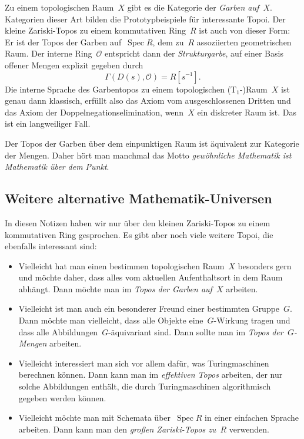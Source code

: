 \documentclass[a4paper,ngerman,12pt]{scrartcl}
\theoremstyle{definition}
\theoremstyle{plain}
\theoremstyle{remark}
\renewcommand{\O}{\mathcal{O}}
\DeclareMathOperator{\Spec}{Spec}
\renewcommand{\_}{\mathpunct{.}\,}
\newcommand{\?}{\,{:}\,}
\begin{document}
Zu einem topologischen Raum~$X$ gibt es die Kategorie der \emph{Garben
auf~$X$}. Kategorien dieser Art bilden die Prototypbeispiele für interessante
Topoi. Der kleine Zariski-Topos zu einem kommutativen Ring~$R$ ist auch von
dieser Form: Er ist der Topos der Garben auf~$\Spec R$, dem zu~$R$ assoziierten
geometrischen Raum. Der interne Ring~$\O$ entspricht dann der
\emph{Strukturgarbe}, auf einer Basis offener Mengen explizit gegeben durch
\[ \Gamma(D(s), \O) = R[s^{-1}]. \]
Die interne Sprache des Garbentopos zu einem topologischen ($\text{T}_1$-)Raum~$X$ ist genau
dann klassisch, erfüllt also das Axiom vom ausgeschlossenen Dritten und das
Axiom der Doppelnegationselimination, wenn~$X$ ein diskreter Raum ist. Das ist
ein langweiliger Fall.

Der Topos der Garben über dem einpunktigen Raum ist äquivalent zur Kategorie
der Mengen. Daher hört man manchmal das Motto \emph{gewöhnliche Mathematik ist
Mathematik über dem Punkt}.


\subsection*{Weitere alternative Mathematik-Universen}

In diesen Notizen haben wir nur über den kleinen Zariski-Topos zu einem
kommutativen Ring gesprochen. Es gibt aber noch viele weitere Topoi, die
ebenfalls interessant sind:
\begin{itemize}
\item Vielleicht hat man einen bestimmen topologischen Raum~$X$ besonders gern
und möchte daher, dass alles vom aktuellen Aufenthaltsort
in dem Raum abhängt. Dann möchte man im \emph{Topos der Garben auf~$X$}
arbeiten.
\item Vielleicht ist man auch ein besonderer Freund einer bestimmten
Gruppe~$G$. Dann möchte man vielleicht, dass alle Objekte
eine~$G$-Wirkung tragen und dass alle Abbildungen~$G$-äquivariant
sind. Dann sollte man im \emph{Topos der~$G$-Mengen} arbeiten.
\item Vielleicht interessiert man sich vor allem dafür, was Turingmaschinen
berechnen können. Dann kann man im \emph{effektiven Topos} arbeiten, der nur
solche Abbildungen enthält, die durch Turingmaschinen algorithmisch gegeben
werden können.
\item Vielleicht möchte man mit Schemata über~$\Spec R$ in einer einfachen
Sprache arbeiten. Dann kann man den \emph{großen Zariski-Topos zu~$R$} verwenden.
\end{itemize}
\end{document}
